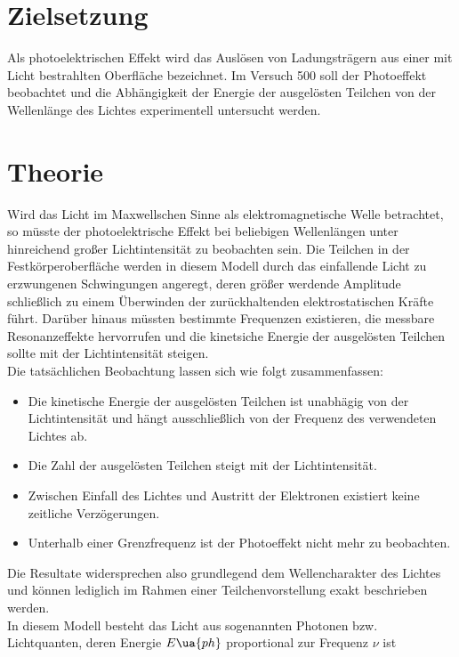 \setcounter{page}{1}
\section*{Zielsetzung}
Als photoelektrischen Effekt wird das Auslösen von Ladungsträgern aus einer
mit Licht bestrahlten Oberfläche bezeichnet. Im Versuch 500 soll der Photoeffekt beobachtet und die
Abhängigkeit der Energie der ausgelösten Teilchen von der Wellenlänge des Lichtes experimentell %
untersucht werden.  
\section{Theorie}
Wird das Licht im Maxwellschen Sinne als elektromagnetische Welle betrachtet, so müsste
der photoelektrische Effekt bei beliebigen Wellenlängen unter hinreichend großer
Lichtintensität zu beobachten sein. Die Teilchen in der Festkörperoberfläche werden in diesem
Modell durch das einfallende Licht zu erzwungenen Schwingungen angeregt, deren größer werdende
Amplitude schließlich zu einem Überwinden der zurückhaltenden elektrostatischen Kräfte führt.
Darüber hinaus müssten bestimmte Frequenzen existieren, die messbare Resonanzeffekte hervorrufen und die kinetsiche
Energie der ausgelösten Teilchen sollte mit der Lichtintensität steigen.\\
Die tatsächlichen Beobachtung lassen sich wie folgt zusammenfassen:
\begin{itemize}
  \item Die kinetische Energie der ausgelösten Teilchen ist unabhägig von der Lichtintensität und
  hängt ausschließlich von der Frequenz des verwendeten Lichtes ab.
  \item Die Zahl der ausgelösten Teilchen steigt mit der Lichtintensität.
  \item Zwischen Einfall des Lichtes und Austritt der Elektronen existiert keine zeitliche Verzögerungen.
  \item Unterhalb einer Grenzfrequenz ist der Photoeffekt nicht mehr zu beobachten.
\end{itemize}
Die Resultate widersprechen also grundlegend dem Wellencharakter des Lichtes und können lediglich im
Rahmen einer Teilchenvorstellung exakt beschrieben werden.\\
In diesem Modell besteht das Licht aus sogenannten Photonen bzw. Lichtquanten, deren Energie $E\ua{ph}$ proportional
zur Frequenz $\nu$ ist
